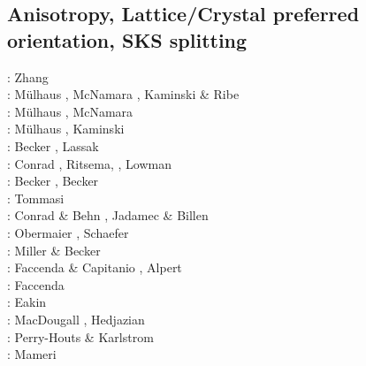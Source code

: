 \subsection{Anisotropy, Lattice/Crystal preferred orientation, SKS splitting}
\label{sec:topics:anisotropy}

\begin{scriptsize}
\nineteeneightythree: Zhang \etal \cite{zhhj93}\\
\twothousandtwo: M\"ulhaus \etal \cite{mudm02}, McNamara \etal \cite{mcvk02}, 
                 Kaminski \& Ribe \cite{kari02}\\
\twothousandthree: M\"ulhaus \etal \cite{mumc03}, McNamara \etal \cite{mcvk03}\\
\twothousandfour: M\"ulhaus \etal \cite{mumc04}, Kaminski \etal \cite{karb04}\\
\twothousandsix: Becker \etal \cite{besb06}, Lassak \etal \cite{lafh06}\\
\twothousandseven: Conrad \etal \cite{cobs07}, Ritsema, \etal \cite{rimb07}, Lowman \etal \cite{lopk07}\\
\twothousandeight: Becker \etal \cite{beke08}, Becker \cite{beck08}\\
\twothousandnine: Tommasi \etal \cite{tokv09}\\
\twothousandten: Conrad \& Behn \cite{cobe10}, Jadamec \& Billen \cite{jabi10a}\\
\twothousandeleven: Obermaier \etal \cite{obbh11}, Schaefer \etal \cite{scbb11}\\
\twothousandtwelve: Miller \& Becker \cite{mibe12}\\
\twothousandthirteen: Faccenda \& Capitanio \cite{faca13}, Alpert \etal \cite{almb13}\\
\twothousandfourteen: Faccenda \cite{facc14}\\
\twothousandfifteen: Eakin \etal \cite{ealw15}\\
\twothousandseventeen: MacDougall \etal \cite{majf17}, Hedjazian \etal \cite{hegd17}\\
\twothousandeighteen: Perry-Houts \& Karlstrom \cite{peka18}\\
\twothousandnineteen: Mameri \etal \cite{mats19}
\end{scriptsize}

